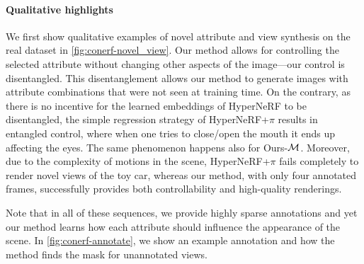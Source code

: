     \paragraph{Qualitative highlights}
      We first show qualitative examples of novel attribute and view synthesis on
      the real dataset in \cref{fig:conerf-novel_view}.
      Our method allows for controlling the selected attribute without changing
      other aspects of the image---our control is disentangled.
      This disentanglement allows our method to generate images with attribute
      combinations that were not seen at training time.
      On the contrary, as there is no incentive for the learned embeddings of
      HyperNeRF to be disentangled, the simple regression strategy of
      HyperNeRF{+}$\pi$ results in entangled control, where when one tries to
      close/open the mouth it ends up affecting the eyes.
      The same phenomenon happens also for Ours{-}$\mathcal{M}$.
      Moreover, due to the complexity of motions in the scene, HyperNeRF{+}$\pi$
      fails completely to render novel views of the toy car, whereas our method,
      with only four annotated frames, successfully provides both controllability
      and high-quality renderings.

      Note that in all of these sequences, we provide highly sparse annotations and
      yet our method learns how each attribute should influence the appearance of
      the scene.
      In \cref{fig:conerf-annotate}, we show an example annotation and how the
      method finds the mask for unannotated views.

      
      
